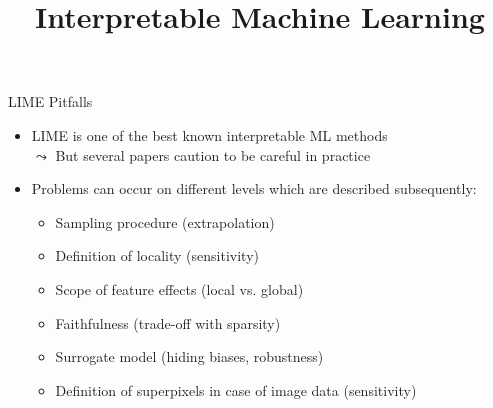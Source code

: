 \documentclass[11pt,compress,t,notes=noshow, aspectratio=169, xcolor=table]{beamer}
\title{Interpretable Machine Learning}
\date{}
\begin{document}
	
	
	
	
	
	\newcommand{\titlefigure}{figure/lime5}
    \newcommand{\learninggoals}{
    	\item Learn why LIME should be used with caution
    	\item Possible pitfalls of LIME}
	
	
	


\begin{frame}[c]{LIME Pitfalls}
  \begin{itemize}
  	\item %
  	LIME is one of the best known interpretable ML methods\\ 
  	$\leadsto$ But several papers caution to be careful in practice 
  	\item Problems can occur on different levels which are described subsequently: 
  	\begin{itemize}
  	    \item Sampling procedure (extrapolation)
  	    \item Definition of locality (sensitivity)
  	    \item Scope of feature effects (local vs. global)
  	    \item Faithfulness (trade-off with sparsity)
  	    \item Surrogate model (hiding biases, robustness)
  	    \item Definition of superpixels in case of image data (sensitivity)
  	\end{itemize}
  \end{itemize}
  
\end{frame}
  
\end{document}
